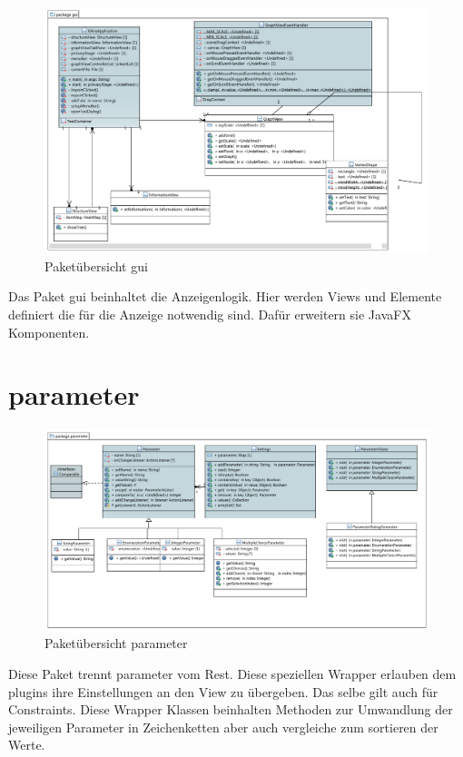 \begin{figure}[hb]
  \centering
  \includegraphics[width=380pt]{resourcen/gui.pdf}
  \caption{Paketübersicht gui}
  \label{fig:packge_gui}
\end{figure}

Das Paket gui beinhaltet die Anzeigenlogik. Hier werden Views und Elemente definiert die für die Anzeige notwendig sind. Dafür erweitern sie JavaFX Komponenten.

\newpage

\section{parameter}

\begin{figure}[hb]
  \centering
  \includegraphics[width=380pt]{resourcen/parameter.pdf}
  \caption{Paketübersicht parameter}
  \label{fig:packge_parameter}
\end{figure}

Diese Paket trennt parameter vom Rest. Diese speziellen Wrapper erlauben dem plugins ihre Einstellungen an den View zu übergeben. Das selbe gilt auch für Constraints. Diese Wrapper Klassen beinhalten Methoden zur Umwandlung der jeweiligen Parameter in Zeichenketten aber auch vergleiche zum sortieren der Werte.

